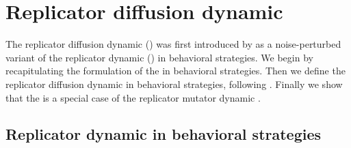 \section{Replicator diffusion dynamic}
\label{sec:repl-diff-dynam}

The replicator diffusion dynamic (\rdd) was first introduced by
\citet{Correia2013:The-Bivalent-Tr} as a noise-perturbed variant of
the replicator dynamic (\rd) in behavioral strategies. We begin by
recapitulating the formulation of the \rd in behavioral
strategies. Then we define the replicator diffusion dynamic in
behavioral strategies, following \citet{Correia2013:The-Bivalent-Tr}.
Finally we show that the \rdd is a special case of the replicator
mutator dynamic \citep[e.g.][]{Nowak2006:Evolutionary-Dy}.

\subsection{Replicator dynamic in behavioral strategies}


